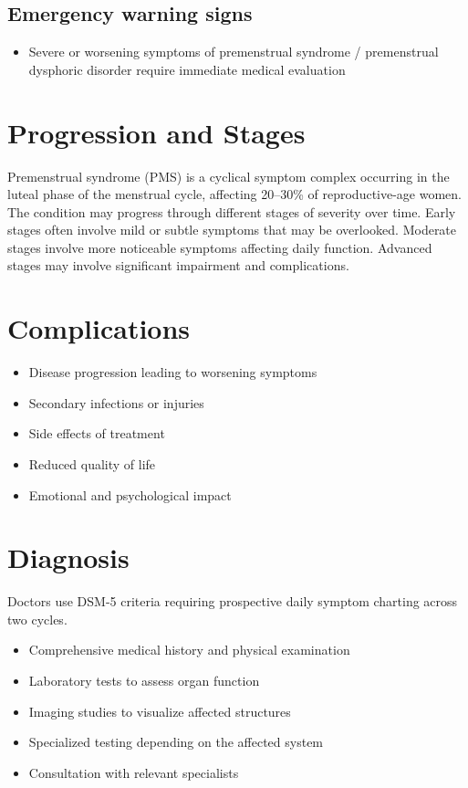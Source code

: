 \subsection{Emergency warning signs}
\begin{itemize}[noitemsep]
  \item Severe or worsening symptoms of premenstrual syndrome / premenstrual dysphoric disorder require immediate medical evaluation
\end{itemize}
\section{Progression and Stages}
Premenstrual syndrome (PMS) is a cyclical symptom complex occurring in the luteal phase of the menstrual cycle, affecting 20--30\% of reproductive-age women. The condition may progress through different stages of severity over time. Early stages often involve mild or subtle symptoms that may be overlooked. Moderate stages involve more noticeable symptoms affecting daily function. Advanced stages may involve significant impairment and complications.
\section{Complications}
\begin{itemize}[noitemsep]
  \item Disease progression leading to worsening symptoms
  \item Secondary infections or injuries
  \item Side effects of treatment
  \item Reduced quality of life
  \item Emotional and psychological impact
\end{itemize}
\section{Diagnosis}
Doctors use DSM-5 criteria requiring prospective daily symptom charting across two cycles.

\begin{itemize}[noitemsep]
  \item Comprehensive medical history and physical examination
  \item Laboratory tests to assess organ function
  \item Imaging studies to visualize affected structures
  \item Specialized testing depending on the affected system
  \item Consultation with relevant specialists
\end{itemize}
